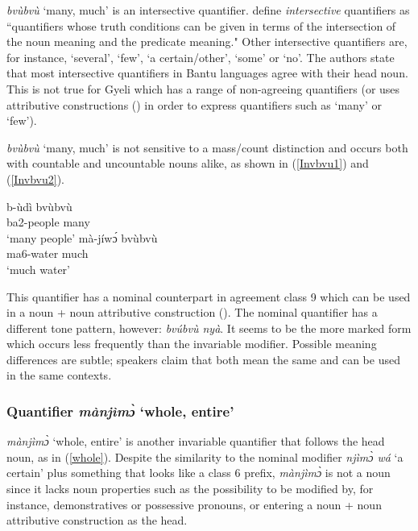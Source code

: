 {\itshape bvùbvù} `many, much'  is an intersective quantifier. \citet[388]{zerbian2008} define {\itshape intersective} quantifiers as ``quantifiers whose truth conditions can be given in terms of the intersection of the noun meaning and the predicate meaning."  Other intersective quantifiers are, for instance, `several', `few', `a certain/other', `some' or `no'. The authors state that most intersective quantifiers in Bantu languages agree with their head noun. This is not true for Gyeli which has a range of non-agreeing quantifiers (or uses attributive constructions () in order to express quantifiers such as `many' or `few'). 

{\itshape bvùbvù} `many, much' is not sensitive to a mass/count distinction and occurs both with countable and uncountable nouns alike, as shown in (\ref{Invbvu1}) and (\ref{Invbvu2}).


\begin{exe}
\ex\label{Invbvu}
\begin{xlist}
\ex\label{Invbvu1}
 \gll  b-ùdì  bvùbvù \\
          ba2-people many  \\
    \trans `many people'
\ex \label{Invbvu2}
  \gll    mà-jíwɔ́ bvùbvù \\
              ma6-water much \\
    \trans `much water'
\end {xlist}
\end {exe}

This quantifier has a nominal counterpart in agreement class 9 which can be used in a noun + noun attributive construction (). The nominal quantifier has a different tone pattern, however: {\itshape bvúbvù nyà}. It seems to be the more marked form which occurs less frequently than the invariable modifier. Possible meaning differences are subtle; speakers claim that both mean the same and can be used in the same contexts.





\subsubsection{Quantifier {\itshape mànjìmɔ̀} `whole, entire'}
\label{sec:mandjimo}

{\itshape mànjìmɔ̀} `whole, entire' is another invariable quantifier that follows the head noun, as in (\ref{whole}). Despite the similarity to the nominal modifier {\itshape njìmɔ̀ wá} `a certain' plus something that looks like a class 6 prefix, {\itshape mànjìmɔ̀} is not a noun since it lacks noun properties such as the possibility to be modified by, for instance, demonstratives or possessive pronouns, or entering a noun + noun attributive construction as the head.


